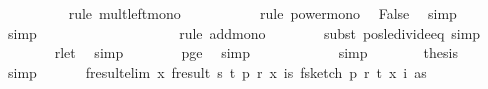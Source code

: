 \begin{isabellebody}
\ \ \ \ \ \ \ \ \isamarkupfalse%
\ {\isacharparenleft}{\kern0pt}rule\ mult{\isacharunderscore}{\kern0pt}left{\isacharunderscore}{\kern0pt}mono{\isacharparenright}{\kern0pt}\isanewline
\ \ \ \ \ \ \ \ \ \isamarkupfalse%
\ {\isacharparenleft}{\kern0pt}rule\ power{\isacharunderscore}{\kern0pt}mono{\isacharparenright}{\kern0pt}\ \isamarkupfalse%
\ False\ \isamarkupfalse%
\ simp\isanewline
\ \ \ \ \ \ \isamarkupfalse%
\ simp{\isacharplus}{\kern0pt}\isanewline
\ \ \ \ \isamarkupfalse%
\ \isamarkupfalse%
\ {\isachardoublequoteopen}{\isachardot}{\kern0pt}{\isachardot}{\kern0pt}{\isachardot}{\kern0pt}\ {\isasymle}\ {}{\isacharslash}{\kern0pt}{}\ {\isacharplus}{\kern0pt}\ {}{\isacharslash}{\kern0pt}{}{\isachardoublequoteclose}\isanewline
\ \ \ \ \ \ \isamarkupfalse%
\ {\isacharparenleft}{\kern0pt}rule\ add{\isacharunderscore}{\kern0pt}mono{\isacharparenright}{\kern0pt}\isanewline
\ \ \ \ \ \ \isamarkupfalse%
\ {\isacharparenleft}{\kern0pt}subst\ pos{\isacharunderscore}{\kern0pt}le{\isacharunderscore}{\kern0pt}divide{\isacharunderscore}{\kern0pt}eq{\isacharcomma}{\kern0pt}\ simp{\isacharparenright}{\kern0pt}\isanewline
\ \ \ \ \ \ \isamarkupfalse%
\ r{\isacharunderscore}{\kern0pt}le{\isacharunderscore}{\kern0pt}t{}\ \isamarkupfalse%
\ simp\isanewline
\ \ \ \ \ \ \isamarkupfalse%
\ p{\isacharunderscore}{\kern0pt}ge{\isacharunderscore}{\kern0pt}{}{}\ \isamarkupfalse%
\ simp\isanewline
\ \ \ \ \isamarkupfalse%
\ \isamarkupfalse%
\ {\isachardoublequoteopen}{\isachardot}{\kern0pt}{\isachardot}{\kern0pt}{\isachardot}{\kern0pt}\ {\isasymle}\ {}{\isacharslash}{\kern0pt}{}{\isachardoublequoteclose}\ \isamarkupfalse%
\ simp\isanewline
\ \ \ \ \isamarkupfalse%
\ \isamarkupfalse%
\ {\isacharquery}{\kern0pt}thesis\ \isamarkupfalse%
\ simp\isanewline
\ \ \isamarkupfalse%
\isanewline
\isanewline
\ \ \isamarkupfalse%
\ f{}{\isacharunderscore}{\kern0pt}result{\isacharunderscore}{\kern0pt}elim{\isacharcolon}{\kern0pt}\ {\isachardoublequoteopen}{\isasymAnd}x{\isachardot}{\kern0pt}\ f{}{\isacharunderscore}{\kern0pt}result\ {\isacharparenleft}{\kern0pt}s{\isacharcomma}{\kern0pt}\ t{\isacharcomma}{\kern0pt}\ p{\isacharcomma}{\kern0pt}\ r{\isacharcomma}{\kern0pt}\ x{\isacharcomma}{\kern0pt}\ {\isasymlambda}i{\isasymin}{\isacharbraceleft}{\kern0pt}{}{\isachardot}{\kern0pt}{\isachardot}{\kern0pt}{\isacharless}{\kern0pt}s{\isacharbraceright}{\kern0pt}{\isachardot}{\kern0pt}\ f{}{\isacharunderscore}{\kern0pt}sketch\ p\ r\ t\ {\isacharparenleft}{\kern0pt}x\ i{\isacharparenright}{\kern0pt}\ as{\isacharparenright}{\kern0pt}\ {\isacharequal}{\kern0pt}\isanewline

\end{isabellebody}
